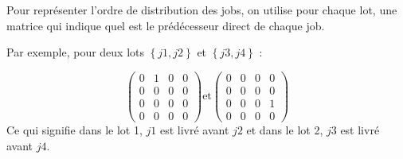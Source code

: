Pour représenter l'ordre de distribution des jobs, on utilise pour chaque lot, une matrice qui indique quel est le prédécesseur direct de chaque job.

Par exemple, pour deux lots $\left\{j1,j2\right\}$ et $\left\{ j3, j4\right\}$ :

$$
	\begin{pmatrix}
		0 & 1 & 0 & 0 \\
		0 & 0 & 0 & 0 \\
		0 & 0 & 0 & 0 \\
		0 & 0 & 0 & 0
	\end{pmatrix}
	\text{et}
	\begin{pmatrix}
		0 & 0 & 0 & 0 \\
		0 & 0 & 0 & 0 \\
		0 & 0 & 0 & 1 \\
		0 & 0 & 0 & 0
	\end{pmatrix}
$$
Ce qui signifie dans le lot 1, $j1$ est livré avant $j2$ et dans le lot 2, $j3$ est livré avant $j4$.

